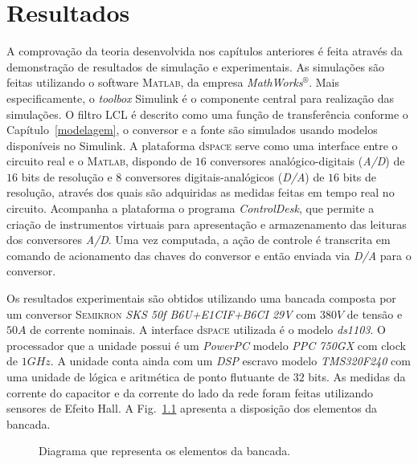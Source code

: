 
\chapter{Resultados}\label{resultados}

  A comprovação da teoria desenvolvida nos capítulos anteriores é feita através da demonstração de resultados de simulação e experimentais. As simulações são feitas utilizando o software \textsc{Matlab}, da empresa \textit{MathWorks}$^\circledR$. Mais especificamente, o \textit{toolbox} Simulink é o componente central para realização das simulações. O filtro LCL é descrito como uma função de transferência conforme o Capítulo~\ref{modelagem}, o conversor e a fonte são simulados usando modelos disponíveis no Simulink. A plataforma d\textsc{space} serve como uma interface entre o circuito real e o \textsc{Matlab}, dispondo de $16$ conversores analógico-digitais (\emph{A/D}) de $16$ bits de resolução e $8$ conversores digitais-analógicos (\emph{D/A}) de $16$ bits de resolução, através dos quais são adquiridas as medidas feitas em tempo real no circuito. Acompanha a plataforma o programa \emph{ControlDesk}, que permite a criação de instrumentos virtuais para apresentação e armazenamento das leituras dos conversores \emph{A/D}. Uma vez computada, a ação de controle é transcrita em comando de acionamento das chaves do conversor e então enviada via \emph{D/A} para o conversor.

  Os resultados experimentais são obtidos utilizando uma bancada composta por um conversor \textsc{Semikron} \textit{SKS 50f B6U+E1CIF+B6CI 29V} com $380V$ de tensão e $50A$ de corrente nominais. A interface d\textsc{space} utilizada é o modelo \textit{ds1103}. O processador que a unidade possui é um \emph{PowerPC} modelo \emph{PPC 750GX} com clock de $1GHz$. A unidade conta ainda com um \emph{DSP} escravo modelo \emph{TMS320F240} com uma unidade de lógica e aritmética de ponto flutuante de $32$ bits. As medidas da corrente do capacitor e da corrente do lado da rede foram feitas utilizando sensores de Efeito Hall. A Fig.~\ref{fig:topologia_bancada} apresenta a disposição dos elementos da bancada.
  \begin{figure}[htb]
    \centering{
      \def\svgwidth{0.9\textwidth}
      }
    \renewcommand\figurename{Fig.}
    \caption{Diagrama que representa os elementos da bancada.}
    \label{fig:topologia_bancada}
  \end{figure}


